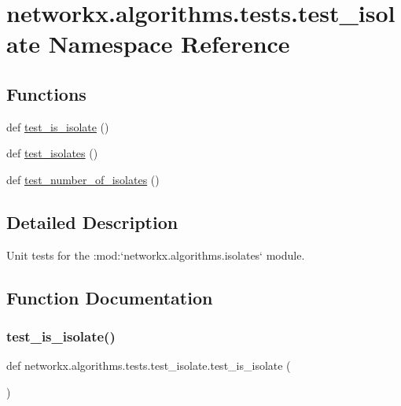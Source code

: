 \hypertarget{namespacenetworkx_1_1algorithms_1_1tests_1_1test__isolate}{}\section{networkx.\+algorithms.\+tests.\+test\+\_\+isolate Namespace Reference}
\label{namespacenetworkx_1_1algorithms_1_1tests_1_1test__isolate}
\subsection*{Functions}
\begin{DoxyCompactItemize}
\item 
def \hyperlink{namespacenetworkx_1_1algorithms_1_1tests_1_1test__isolate_a35e3bdb8a333077eff029686595df426}{test\+\_\+is\+\_\+isolate} ()
\item 
def \hyperlink{namespacenetworkx_1_1algorithms_1_1tests_1_1test__isolate_aef8df877fb7a87413345eb51c5d77d9f}{test\+\_\+isolates} ()
\item 
def \hyperlink{namespacenetworkx_1_1algorithms_1_1tests_1_1test__isolate_aff341d69b12bbb038ca6c77828b177fb}{test\+\_\+number\+\_\+of\+\_\+isolates} ()
\end{DoxyCompactItemize}


\subsection{Detailed Description}
\begin{DoxyVerb}Unit tests for the :mod:`networkx.algorithms.isolates` module.\end{DoxyVerb}
 

\subsection{Function Documentation}
\mbox{\label{namespacenetworkx_1_1algorithms_1_1tests_1_1test__isolate_a35e3bdb8a333077eff029686595df426}} 
\subsubsection{\texorpdfstring{test\+\_\+is\+\_\+isolate()}{test\_is\_isolate()}}
{\footnotesize\ttfamily def networkx.\+algorithms.\+tests.\+test\+\_\+isolate.\+test\+\_\+is\+\_\+isolate (\begin{DoxyParamCaption}{ }\end{DoxyParamCaption})}

